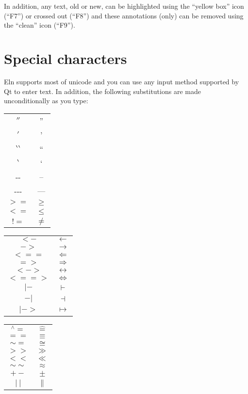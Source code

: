 \documentclass[11pt]{report}
\begin{document}
In addition, any text, old or new, can be highlighted using the
``yellow box'' icon (``F7'') or crossed out (``F8'') and these
annotations (only) can be removed using the ``clean'' icon (``F9'').

\section{Special characters}

Eln supports most of unicode and you can use any input method
supported by Qt to enter text. In addition, the following
substitutions are made unconditionally as you type:
\begin{multicols}{3}
\begin{tabular}{cc}
$''$ & '' \\
$'$ & ' \\
$\backprime\backprime$ & `` \\
$\backprime$ & ` \\
-{}- & -- \\
-{}-{}- & --- \\
$>=$ & $\geq$ \\
$<=$ & $\leq$ \\
$!=$ & $\neq$ 
\end{tabular}

\begin{tabular}{cc}
$<$$-$ & $\leftarrow$ \\
$-$$>$ & $\rightarrow$ \\
$<==$ & $\Leftarrow$ \\
$=>$ & $\Rightarrow$ \\
$<$$-$$>$ & $\leftrightarrow$ \\
$<==>$ & $\Leftrightarrow$ \\
$|-$ & $\vdash$ \\
$-|$ & $\dashv$ \\
$|-$$>$ & $\mapsto$ \\
\end{tabular}

\begin{tabular}{cc}
$^\wedge{}=$ & $\hat=$ \\
$==$ & $\equiv$ \\
$\sim=$ & $\cong$ \\
$>>$ & $\gg$ \\
$<<$ & $\ll$ \\
$\sim\sim$ & $\approx$ \\
$+-$ & $\pm$ \\
$|~|$ & $ \parallel $ \\
\end{tabular}

\end{multicols}
\end{document}
